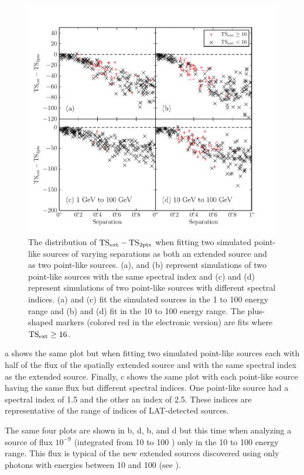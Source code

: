 \begin{figure}[htbp]
  \includegraphics{chapters/extended_analysis/figures/mc_plots/confusion_2pts_plot_color.pdf}
  \caption{The distribution of $\mathrm{TS}_\mathrm{ext}-\mathrm{TS}_{\mathrm{2pts}}$ when fitting two simulated
  point-like sources of varying separations as both an extended source
  and as two point-like sources.  (a), and (b) represent simulations
  of two point-like sources with the same spectral index and (c) and
  (d) represent simulations of two point-like sources with different
  spectral indices.  (a) and (c) fit the simulated sources in the 1
  \gev to 100 \gev energy range and (b) and (d) fit in the 10 \gev to
  100 \gev energy range.  The plus-shaped markers (colored red in the
  electronic version) are fits where $\mathrm{TS}_\mathrm{ext}\ge16$.}
\end{figure}

a shows the same plot but when fitting two
simulated point-like sources each with half of the flux of the spatially
extended source and with the same spectral index as the extended source.
Finally, c shows the same plot with each
point-like source having the same flux but different spectral indices.
One point-like source had a spectral index of 1.5 and the other an index
of 2.5.  These indices are representative of the range of indices of
LAT-detected sources.

The same four plots are shown in b,
d, b, and
d but this time when analyzing a source of
flux $10^{-9}$ \fluxunits (integrated from 10 \gev to 100 \gev) only in
the 10 \gev to 100 \gev energy range.  This flux is typical of the new
extended sources discovered using only photons with energies between 10
\gev and 100 \gev (see ).

